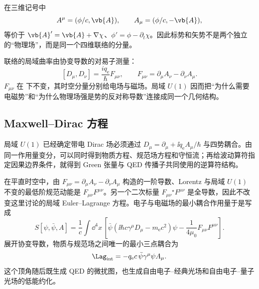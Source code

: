 在三维记号中
\begin{equation*}
A^\mu=(\phi/c,\vb{A}),
\qquad
A_\mu=(\phi/c,-\vb{A}),
\end{equation*}
 等价于 $\vb{A}' =\vb{A}+\nabla\chi$、$\phi'=\phi-\partial_t\chi$。因此标势和矢势不是两个独立的“物理场”，而是同一个四维联络的分量。

联络的局域曲率由协变导数的对易子测量：
\begin{equation}
{
[D_\mu,D_\nu]=\frac{i q_{\mathrm e}}{\hbar}F_{\mu\nu},
\qquad
F_{\mu\nu}=\partial_\mu A_\nu-\partial_\nu A_\mu.}
\label{eq:covariant-commutator}
\end{equation}
$F_{\mu\nu}$ 在 下不变，其时空分量分别给电场与磁场。局域 $U(1)$ 因而把“为什么需要电磁势”和“为什么物理场强是势的反对称导数”连接成同一个几何结构。

\subsection{Maxwell--Dirac 方程}

局域 $U(1)$ 已经确定带电 Dirac 场必须通过 $D_\mu=\partial_\mu+\ii q_{\mathrm e} A_\mu/\hbar$ 与四势耦合。由同一作用量变分，可以同时得到物质方程、规范场方程和守恒流；再给波动算符指定因果边界条件，就得到 Green 张量与 QED 传播子共同使用的逆算符结构。

在平直时空中，由 $F_{\mu\nu}=\partial_\mu A_\nu-\partial_\nu A_\mu$ 构造的一阶导数、Lorentz 与局域 $U(1)$ 不变的最低阶规范动能是 $F_{\mu\nu}F^{\mu\nu}$。另一个二次标量 $F_{\mu\nu}{}^\star\!F^{\mu\nu}$ 是全导数，因此不改变这里讨论的局域 Euler--Lagrange 方程。电子与电磁场的最小耦合作用量于是写成
\begin{equation}
 {
 S[\psi,\bar\psi,A]
 =\frac1c\int\dd^4 x\,
 \left[
 \bar\psi\left(\ii\hbar c\gamma^\mu D_\mu-m_{\mathrm e} c^2\right)\psi
 -\frac{1}{4\mu_0}F_{\mu\nu}F^{\mu\nu}
 \right].}
 \label{eq:maxwell-dirac-action}
\end{equation}
展开协变导数，物质与规范场之间唯一的最小三点耦合为
\begin{equation}
 {
 \Lag_{\rm int}
 =-q_{\mathrm e} c\,\bar\psi\gamma^\mu\psi A_\mu.}
 \label{eq:qed-interaction-lagrangian}
\end{equation}
这个顶角随后既生成 QED 的微扰图，也生成自由电子--经典光场和自由电子--量子光场的低能约化。

